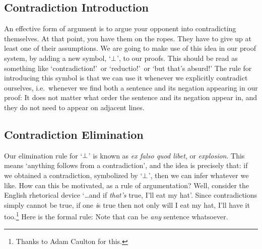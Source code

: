 \subsection{Contradiction Introduction}
An effective form of argument is to argue your opponent into contradicting themselves. At that point, you have them on the ropes. They have to give up at least one of their assumptions. We are going to make use of this idea in our proof system, by adding a new symbol, `$\bot$', to our proofs. This should be read as something like `contradiction!'\ or `reductio!'\ or `but that's absurd!'  The rule for introducing this symbol is that we can use it whenever we explicitly contradict ourselves, i.e.\ whenever we find both a sentence and its negation appearing in our proof:
It does not matter what order the sentence and its negation appear in, and they do not need to appear on adjacent lines.


\subsection{Contradiction Elimination}
Our elimination rule for `$\bot$' is known as \emph{ex falso quod libet}, or \emph{explosion}. This means `anything follows from a contradiction', and the idea is precisely that: if we obtained a contradiction, symbolized by `$\bot$', then we can infer whatever we like. How can this be motivated, as a rule of argumentation? Well, consider the English rhetorical device `\ldots and if \emph{that's} true, I'll eat my hat'. Since contradictions simply cannot be true, if one \emph{i}s true then not only will I eat my hat, I'll have it too.\footnote{Thanks to Adam Caulton for this.} Here is the formal rule:
Note that \metaX can be \emph{any} sentence whatsoever.


